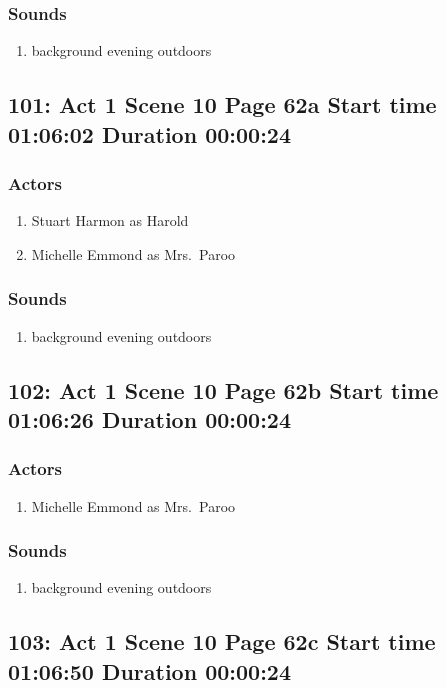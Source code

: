\subsubsection{Sounds}
\begin{enumerate}
\item background evening outdoors
\end{enumerate}
\subsection{101: Act 1 Scene 10 Page 62a Start time 01:06:02 Duration 00:00:24}

\subsubsection{Actors}
\begin{enumerate}
\item Stuart Harmon as Harold
\item Michelle Emmond as Mrs.~Paroo
\end{enumerate}

\subsubsection{Sounds}
\begin{enumerate}
\item background evening outdoors
\end{enumerate}
\subsection{102: Act 1 Scene 10 Page 62b Start time 01:06:26 Duration 00:00:24}

\subsubsection{Actors}
\begin{enumerate}
\item Michelle Emmond as Mrs.~Paroo
\end{enumerate}

\subsubsection{Sounds}
\begin{enumerate}
\item background evening outdoors
\end{enumerate}
\subsection{103: Act 1 Scene 10 Page 62c Start time 01:06:50 Duration 00:00:24}

